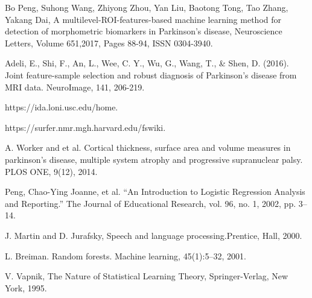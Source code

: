 \documentclass[runningheads,a4paper]{llncs}
\begin{document}
\begin{thebibliography}{4}
 Bo Peng, Suhong Wang, Zhiyong Zhou, Yan Liu, Baotong Tong, Tao Zhang, Yakang Dai, A multilevel-ROI-features-based machine learning method for detection of morphometric  biomarkers in Parkinson’s disease, Neuroscience Letters, Volume 651,2017, Pages 88-94, ISSN 0304-3940.

 Adeli, E., Shi, F., An, L., Wee, C. Y., Wu, G., Wang, T., \& Shen, D. (2016). Joint feature-sample selection and robust diagnosis of Parkinson's disease from MRI data. NeuroImage, 141, 206-219.

 https://ida.loni.usc.edu/home.

 https://surfer.nmr.mgh.harvard.edu/fswiki.

  A.  Worker  and et al. Cortical  thickness,  surface  area  and  volume  measures  in  parkinson’s  disease, multiple system atrophy and progressive supranuclear palsy. PLOS ONE, 9(12), 2014.

 Peng, Chao-Ying Joanne, et al. “An Introduction to Logistic Regression Analysis and Reporting.” The Journal of Educational Research, vol. 96, no. 1, 2002, pp. 3–14.

 J. Martin and D. Jurafsky, Speech and language processing.Prentice, Hall, 2000.



 L. Breiman. Random forests. Machine learning, 45(1):5–32, 2001.

 V. Vapnik, The Nature of Statistical Learning Theory, Springer-Verlag, New York, 1995.

\end{thebibliography}



\end{document}

